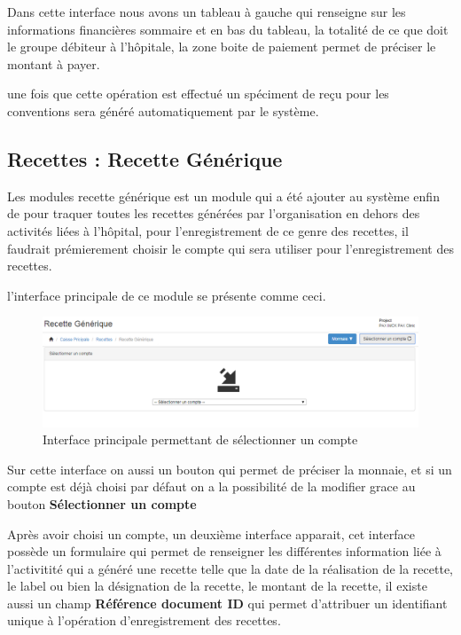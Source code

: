 \documentclass[12pt,a4paper]{report}
\begin{document}
Dans cette interface nous avons un tableau à gauche qui renseigne sur les informations financières sommaire et en bas du tableau, la totalité de ce que doit le groupe débiteur à l'hôpitale, la zone boite de paiement permet de préciser le montant à payer.

une fois que cette opération est effectué un spéciment de reçu pour les conventions sera généré automatiquement par le système.

\newpage
\subsection{Recettes : Recette Générique}
Les modules recette générique est un module qui a été ajouter au système enfin de pour traquer toutes les recettes générées par l'organisation en dehors des activités liées à l'hôpital, pour l'enregistrement de ce genre des recettes, il faudrait prémierement choisir le compte qui sera utiliser pour l'enregistrement des recettes.

l'interface principale de ce module se présente comme ceci.

\begin{figure}[h]
\begin{center}
\includegraphics[width=14cm]{pic/recetteGen.png}
\end{center}
\caption{Interface principale permettant de sélectionner un compte}
\label{Interface principale permettant de sélectionner un compte}
\end{figure}

Sur cette interface on aussi un bouton qui permet de préciser la monnaie, et si un compte est déjà choisi par défaut on a la possibilité de la modifier grace au bouton \textbf{Sélectionner un compte}

Après avoir choisi un compte, un deuxième interface apparait, cet interface possède un formulaire qui permet de renseigner les différentes information liée à l'activitité qui a généré une recette telle que la date de la réalisation de la recette, le label ou bien la désignation de la recette, le montant de la recette, il existe aussi un champ \textbf{Référence document ID} qui permet d'attribuer un identifiant unique à l'opération d'enregistrement des recettes.
\end{document}
